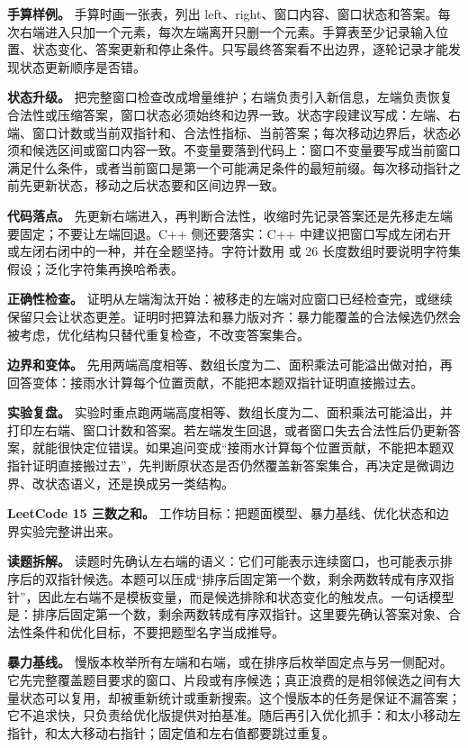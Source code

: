 \textbf{手算样例。} 手算时画一张表，列出 left、right、窗口内容、窗口状态和答案。每次右端进入只加一个元素，每次左端离开只删一个元素。手算表至少记录输入位置、状态变化、答案更新和停止条件。只写最终答案看不出边界，逐轮记录才能发现状态更新顺序是否错。

\textbf{状态升级。} 把完整窗口检查改成增量维护；右端负责引入新信息，左端负责恢复合法性或压缩答案，窗口状态必须始终和边界一致。状态字段建议写成：左端、右端、窗口计数或当前双指针和、合法性指标、当前答案；每次移动边界后，状态必须和候选区间或窗口内容一致。不变量要落到代码上：窗口不变量要写成当前窗口满足什么条件，或者当前窗口是第一个可能满足条件的最短前缀。每次移动指针之前先更新状态，移动之后状态要和区间边界一致。

\textbf{代码落点。} 先更新右端进入，再判断合法性，收缩时先记录答案还是先移走左端要固定；不要让左端回退。C++ 侧还要落实：C++ 中建议把窗口写成左闭右开或左闭右闭中的一种，并在全题坚持。字符计数用  或 26 长度数组时要说明字符集假设；泛化字符集再换哈希表。

\textbf{正确性检查。} 证明从左端淘汰开始：被移走的左端对应窗口已经检查完，或继续保留只会让状态更差。证明时把算法和暴力版对齐：暴力能覆盖的合法候选仍然会被考虑，优化结构只替代重复检查，不改变答案集合。

\textbf{边界和变体。} 先用两端高度相等、数组长度为二、面积乘法可能溢出做对拍，再回答变体：接雨水计算每个位置贡献，不能把本题双指针证明直接搬过去。

\textbf{实验复盘。} 实验时重点跑两端高度相等、数组长度为二、面积乘法可能溢出，并打印左右端、窗口计数和答案。若左端发生回退，或者窗口失去合法性后仍更新答案，就能很快定位错误。如果追问变成“接雨水计算每个位置贡献，不能把本题双指针证明直接搬过去”，先判断原状态是否仍然覆盖新答案集合，再决定是微调边界、改状态语义，还是换成另一类结构。

\noindent\textbf{LeetCode 15 三数之和。} 工作坊目标：把题面模型、暴力基线、优化状态和边界实验完整讲出来。

\textbf{读题拆解。} 读题时先确认左右端的语义：它们可能表示连续窗口，也可能表示排序后的双指针候选。本题可以压成“排序后固定第一个数，剩余两数转成有序双指针”，因此左右端不是模板变量，而是候选排除和状态变化的触发点。一句话模型是：排序后固定第一个数，剩余两数转成有序双指针。这里要先确认答案对象、合法性条件和优化目标，不要把题型名字当成推导。

\textbf{暴力基线。} 慢版本枚举所有左端和右端，或在排序后枚举固定点与另一侧配对。它先完整覆盖题目要求的窗口、片段或有序候选；真正浪费的是相邻候选之间有大量状态可以复用，却被重新统计或重新搜索。这个慢版本的任务是保证不漏答案；它不追求快，只负责给优化版提供对拍基准。随后再引入优化抓手：和太小移动左指针，和太大移动右指针；固定值和左右值都要跳过重复。

